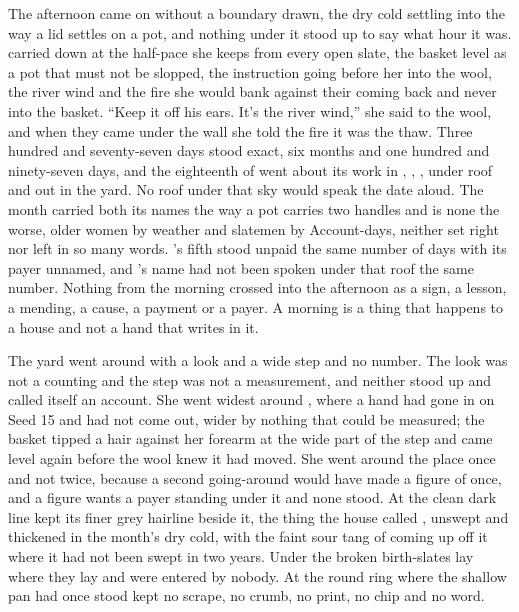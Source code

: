 The afternoon came on without a boundary drawn, the dry cold settling into  the way a lid settles on a pot, and nothing under it stood up to say what hour it was.  carried  down  at the half-pace she keeps from every open slate, the basket level as a pot that must not be slopped, the instruction going before her into the wool, the river wind and the fire she would bank against their coming back and never into the basket. “Keep it off his ears. It's the river wind,” she said to the wool, and when they came under the wall she told the fire it was the thaw. Three hundred and seventy-seven days stood exact, six months and one hundred and ninety-seven days, and the eighteenth of  went about its work in , , , under  roof and out in the yard. No roof under that sky would speak the date aloud. The month carried both its names the way a pot carries two handles and is none the worse, older women by weather and slatemen by Account-days, neither set right nor left in so many words. 's fifth stood unpaid the same number of days with its payer unnamed, and 's name had not been spoken under that roof the same number. Nothing from the morning crossed into the afternoon as a sign, a lesson, a mending, a cause, a payment or a payer. A morning is a thing that happens to a house and not a hand that writes in it.

The yard went around  with a look and a wide step and no number. The look was not a counting and the step was not a measurement, and neither stood up and called itself an account. She went widest around , where a hand had gone in on Seed 15 and had not come out, wider by nothing that could be measured; the basket tipped a hair against her forearm at the wide part of the step and came level again before the wool knew it had moved. She went around the place once and not twice, because a second going-around would have made a figure of once, and a figure wants a payer standing under it and none stood. At  the clean dark line kept its finer grey hairline beside it, the thing the house called , unswept and thickened in the month's dry cold, with the faint sour tang of  coming up off it where it had not been swept in two years. Under  the broken birth-slates lay where they lay and were entered by nobody. At  the round ring where the shallow pan had once stood kept no scrape, no crumb, no print, no chip and no word.

